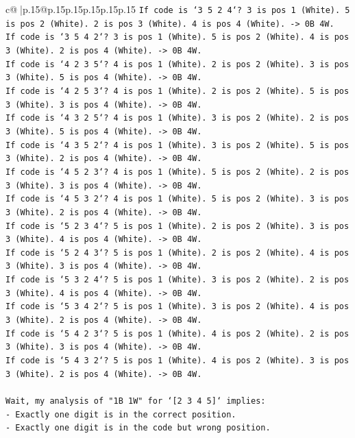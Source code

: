 \documentclass{article}
\begin{document}
{\begin{supertabular}{c@{$\;$}|p{.15\linewidth}@{}p{.15\linewidth}p{.15\linewidth}p{.15\linewidth}p{.15\linewidth}p{.15\linewidth}}
{{{\texttt{If code is `3 5 2 4`? 3 is pos 1 (White). 5 is pos 2 (White). 2 is pos 3 (White). 4 is pos 4 (White). {-}> 0B 4W.} \\
\texttt{If code is `3 5 4 2`? 3 is pos 1 (White). 5 is pos 2 (White). 4 is pos 3 (White). 2 is pos 4 (White). {-}> 0B 4W.} \\
\texttt{If code is `4 2 3 5`? 4 is pos 1 (White). 2 is pos 2 (White). 3 is pos 3 (White). 5 is pos 4 (White). {-}> 0B 4W.} \\
\texttt{If code is `4 2 5 3`? 4 is pos 1 (White). 2 is pos 2 (White). 5 is pos 3 (White). 3 is pos 4 (White). {-}> 0B 4W.} \\
\texttt{If code is `4 3 2 5`? 4 is pos 1 (White). 3 is pos 2 (White). 2 is pos 3 (White). 5 is pos 4 (White). {-}> 0B 4W.} \\
\texttt{If code is `4 3 5 2`? 4 is pos 1 (White). 3 is pos 2 (White). 5 is pos 3 (White). 2 is pos 4 (White). {-}> 0B 4W.} \\
\texttt{If code is `4 5 2 3`? 4 is pos 1 (White). 5 is pos 2 (White). 2 is pos 3 (White). 3 is pos 4 (White). {-}> 0B 4W.} \\
\texttt{If code is `4 5 3 2`? 4 is pos 1 (White). 5 is pos 2 (White). 3 is pos 3 (White). 2 is pos 4 (White). {-}> 0B 4W.} \\
\texttt{If code is `5 2 3 4`? 5 is pos 1 (White). 2 is pos 2 (White). 3 is pos 3 (White). 4 is pos 4 (White). {-}> 0B 4W.} \\
\texttt{If code is `5 2 4 3`? 5 is pos 1 (White). 2 is pos 2 (White). 4 is pos 3 (White). 3 is pos 4 (White). {-}> 0B 4W.} \\
\texttt{If code is `5 3 2 4`? 5 is pos 1 (White). 3 is pos 2 (White). 2 is pos 3 (White). 4 is pos 4 (White). {-}> 0B 4W.} \\
\texttt{If code is `5 3 4 2`? 5 is pos 1 (White). 3 is pos 2 (White). 4 is pos 3 (White). 2 is pos 4 (White). {-}> 0B 4W.} \\
\texttt{If code is `5 4 2 3`? 5 is pos 1 (White). 4 is pos 2 (White). 2 is pos 3 (White). 3 is pos 4 (White). {-}> 0B 4W.} \\
\texttt{If code is `5 4 3 2`? 5 is pos 1 (White). 4 is pos 2 (White). 3 is pos 3 (White). 2 is pos 4 (White). {-}> 0B 4W.} \\
\\ 
\texttt{Wait, my analysis of "1B 1W" for `{[}2 3 4 5{]}` implies:} \\
\texttt{{-} Exactly one digit is in the correct position.} \\
\texttt{{-} Exactly one digit is in the code but wrong position.} \\
}}}
\end{supertabular}}
\end{document}

